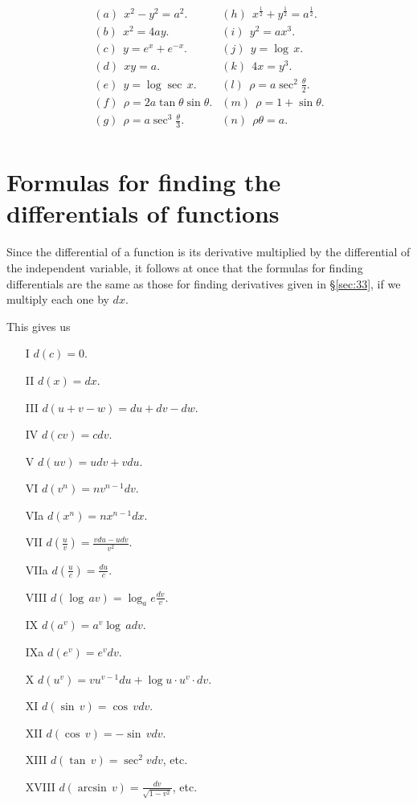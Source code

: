 \begin{enumerate}
\[
\begin{array}{ll}
(a)\ \  x^2 - y^2 = a^2. &	(h)\ \  x^{\frac{1}{2}} + y^{\frac{1}{2}} = a^{\frac{1}{2}}.\\
(b)\ \  x^2 = 4ay. &	(i)\ \  y^2 = ax^3.\\
(c)\ \  y = e^x + e^{- x}.  &	(j)\ \  y = \log\, x.\\
(d)\ \  xy = a.  &	(k)\ \  4x = y^3.\\
(e)\ \  y = \log\sec\,x.  &	(l)\ \  \rho = a \sec^2 \frac{\theta}{2}.\\
(f)\ \  \rho  = 2a\tan\theta \sin\theta .  &	(m)\ \  \rho  = 1 + \sin\theta .\\
(g)\ \  \rho = a \sec^3 \frac{\theta}{3}.  &	(n)\ \  \rho \theta  = a.\\
\end{array}
\]

\end{enumerate}


\section{Formulas for finding the differentials of functions}

Since the differential of a function is its derivative multiplied 
by the differential of the independent variable, it follows at 
once that the formulas for finding differentials are the same 
as those for finding derivatives given in \S \ref{sec:33}, %
if we multiply each one by $dx$.

This gives us

\begin{itemize}
\item[I]
$  	d(c) 	= 0.$

\item[II] 
$	  	d(x) 	= dx.$
\item[III] 
$	  	d(u + v - w) 	= du + dv - dw.$
\item[IV] 
$	  	d(cv) 	= cdv.$
\item[V] 	
$  	d(uv) 	= udv + vdu$.
\item[VI] 
$	  	d(v^n) 	= nv^{n - 1}dv$.
\item[VIa] 
$	d(x^n) 	= nx^{n-1}dx$.
\item[VII] 	
$  	d \left ( \frac{u}{v} \right ) 	= \frac{v du - u dv}{v^2}$.
\item[VIIa] 
$	d \left ( \frac{u}{c} \right ) 	= \frac{du}{c}$.
\item[VIII] 
$	  	d(\log\, av) 	= \log_a e \frac{dv}{v}$.
\item[IX] 	 $ 	d(a^v) 	= a^v\log\, a dv$.
\item[IXa] $	d(e^v) = 	e^vdv$.
\item[X] 	
$  	d(u^v) 	= vu^{v-1} du + \log u \cdot u^v \cdot dv$.
\item[XI] 
$ 	d(\sin\, v) 	= \cos\, v dv$.
\item[XII] 	
$  	d(\cos\, v) 	= -\sin\, vdv$.
\item[XIII] 
$	  	d(\tan\,v) 	= \sec^2vdv$, etc.
\item[XVIII] 	  
$	d(\arcsin\,v) 	= \frac{dv}{\sqrt{1 - v^2}}$, etc.
\end{itemize}

